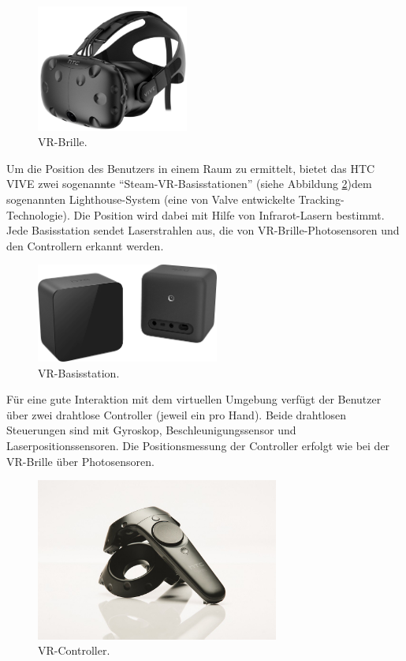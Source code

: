 \begin{figure}[h] \centering
\includegraphics[width=5cm]{Images/vr-brille.png} 
\caption[VR-Brille]{ VR-Brille\cite{vive19}. }
\label{vr-brille} 
\end{figure}


Um die Position des Benutzers in einem Raum zu ermittelt, bietet das HTC VIVE zwei sogenannte ``Steam-VR-Basisstationen'' (siehe Abbildung \ref{vr-base})dem sogenannten Lighthouse-System (eine von Valve entwickelte Tracking-Technologie). 
Die Position wird dabei mit Hilfe von Infrarot-Lasern bestimmt. 
Jede Basisstation sendet Laserstrahlen aus, die von VR-Brille-Photosensoren und den Controllern erkannt werden. \\


\begin{figure}[h] \centering
\includegraphics[width=6cm]{Images/vr-base.png} 
\caption[VR-Basisstation]{ VR-Basisstation\cite{vive19}. }
\label{vr-base} 
\end{figure}


F{\"u}r eine gute Interaktion mit dem virtuellen Umgebung verf{\"u}gt der Benutzer {\"u}ber zwei  drahtlose Controller (jeweil ein pro Hand). 
Beide drahtlosen Steuerungen sind mit Gyroskop, Beschleunigungssensor und Laserpositionssensoren. 
Die Positionsmessung der Controller erfolgt wie bei der VR-Brille {\"u}ber  Photosensoren. \\


\begin{figure}[h] \centering
\includegraphics[width=8cm]{Images/vr-controller.png} 
\caption[VR-Controller]{ VR-Controller\cite{vive19}. }
\label{vr-controller} 
\end{figure}




